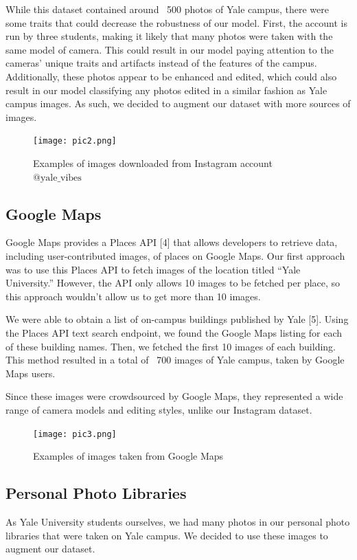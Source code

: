 \documentclass[letterpaper]{article} %
\begin{document}
While this dataset contained around ~500 photos of Yale campus, there were some traits that could decrease the robustness of our model. First, the account is run by three students, making it likely that many photos were taken with the same model of camera. This could result in our model paying attention to the cameras’ unique traits and artifacts instead of the features of the campus. Additionally, these photos appear to be enhanced and edited, which could also result in our model classifying any photos edited in a similar fashion as Yale campus images. As such, we decided to augment our dataset with more sources of images. 

\begin{figure}
    \centering
    \texttt{[image: pic2.png]}
    \caption{Examples of images downloaded from Instagram account $\text{@yale\_vibes}$}
    \label{fig:enter-label}
\end{figure}


\subsection{Google Maps}
Google Maps provides a Places API [4] that allows developers to retrieve data, including user-contributed images, of places on Google Maps. Our first approach was to use this Places API to fetch images of the location titled “Yale University.” However, the API only allows 10 images to be fetched per place, so this approach wouldn’t allow us to get more than 10 images.

We were able to obtain a list of on-campus buildings published by Yale [5]. Using the Places API text search endpoint, we found the Google Maps listing for each of these building names. Then, we fetched the first 10 images of each building. This method resulted in a total of ~700 images of Yale campus, taken by Google Maps users.

Since these images were crowdsourced by Google Maps, they represented a wide range of camera models and editing styles, unlike our Instagram dataset.

\begin{figure}
    \centering
    \texttt{[image: pic3.png]}
    \caption{Examples of images taken from Google Maps}
    \label{fig:enter-label}
\end{figure}

\subsection{Personal Photo Libraries}
As Yale University students ourselves, we had many photos in our personal photo libraries that were taken on Yale campus. We decided to use these images to augment our dataset.
\end{document}

